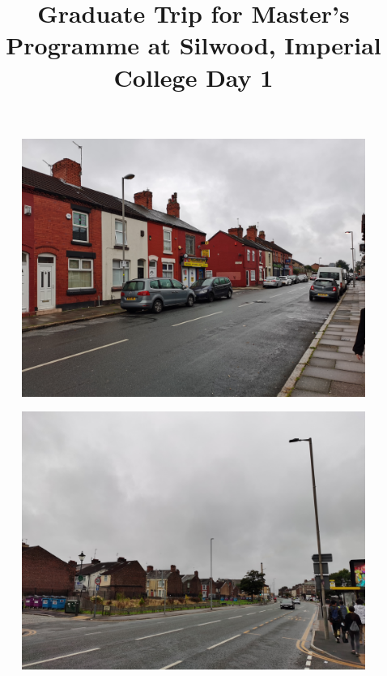 \documentclass[11pt]{article}
\title{Graduate Trip for Master's Programme at Silwood, Imperial College \newline Day 1}
\begin{document}
  \maketitle
  
  \newpage

  \linenumbers

\begin{figure}[H]
    \centering
    \includegraphics[width=\textwidth]{1A.jpg}
\end{figure}

\begin{figure}[H]
    \centering
    \includegraphics[width=\textwidth]{1B.jpg}
\end{figure}
\end{document}
